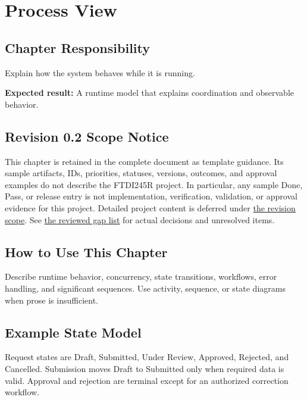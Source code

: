 \chapter{Process View}
\section{Chapter Responsibility}
\label{Section:ProcessViewResponsibility}
Explain how the system behaves while it is running.

\noindent\textbf{Expected result:} A runtime model that explains coordination and observable behavior.

\section{Revision 0.2 Scope Notice}
\label{Section:DeferredProcessView}
\begin{fsaNote}
This chapter is retained in the complete document as template guidance.
Its sample artifacts, IDs, priorities, statuses, versions, outcomes, and
approval examples do not describe the FTDI245R project. In particular, any
sample Done, Pass, or release entry is not implementation, verification,
validation, or approval evidence for this project. Detailed project content
is deferred under \hyperref[Section:ProjectScope]{the revision scope}.
See \hyperref[Table:ProjectGapReview]{the reviewed gap list} for actual
decisions and unresolved items.
\end{fsaNote}

\section{How to Use This Chapter}
Describe runtime behavior, concurrency, state transitions, workflows, error handling, and significant sequences. Use activity, sequence, or state diagrams when prose is insufficient.
\section{Example State Model}
Request states are Draft, Submitted, Under Review, Approved, Rejected, and Cancelled. Submission moves Draft to Submitted only when required data is valid. Approval and rejection are terminal except for an authorized correction workflow.
